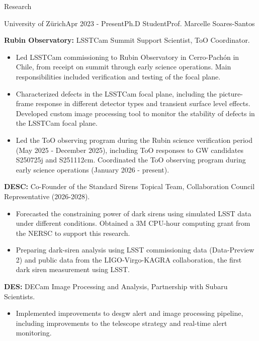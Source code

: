 \documentclass{resume} %
\begin{document}
\begin{rSection}{Research}

\begin{rSubsection}{University of Zürich}{Apr 2023 - Present}{Ph.D Student}{Prof. Marcelle Soares-Santos}

    \item \textbf{Rubin Observatory:} \ac{LSSTCam} Summit Support Scientist, \ac{ToO} Coordinator.
    \begin{itemize}
        \item Led \ac{LSSTCam} commissioning to Rubin Observatory in Cerro-Pachón in Chile, from receipt on summit through early science operations. Main responsibilities included verification and testing of the focal plane.
        \item Characterized defects in the \ac{LSSTCam} focal plane, including the picture-frame response in different detector types and transient surface level effects. Developed custom image processing tool to monitor the stability of defects in the \ac{LSSTCam} focal plane.
        \item Led the \ac{ToO} observing program during the Rubin science verification period (May 2025 - December 2025), including \ac{ToO} responses to \ac{GW} candidates S250725j and S251112cm. Coordinated the \ac{ToO} observing program during early science operations (January 2026 - present).
    \end{itemize}
    \item \textbf{\ac{DESC}:} Co-Founder of the Standard Sirens Topical Team, Collaboration Council Representative (2026-2028).
    \begin{itemize}
        \item Forecasted the constraining power of dark sirens using simulated \ac{LSST} data under different conditions. Obtained a 3M CPU-hour computing grant from the \ac{NERSC} to support this research.
        \item Preparing dark-siren analysis using LSST commissioning data (Data-Preview 2) and public data from the LIGO-Virgo-KAGRA collaboration, the first dark siren measurement using LSST.
    \end{itemize}
     \item \textbf{\ac{DES}:} \ac{DECam} Image Processing and Analysis, Partnership with Subaru Scientists.
     \begin{itemize}
         \item Implemented improvements to \ac{desgw} alert and image processing pipeline, including improvements to the telescope strategy and real-time alert monitoring.

\end{itemize}
\end{rSubsection}
\end{rSection}
\end{document}
